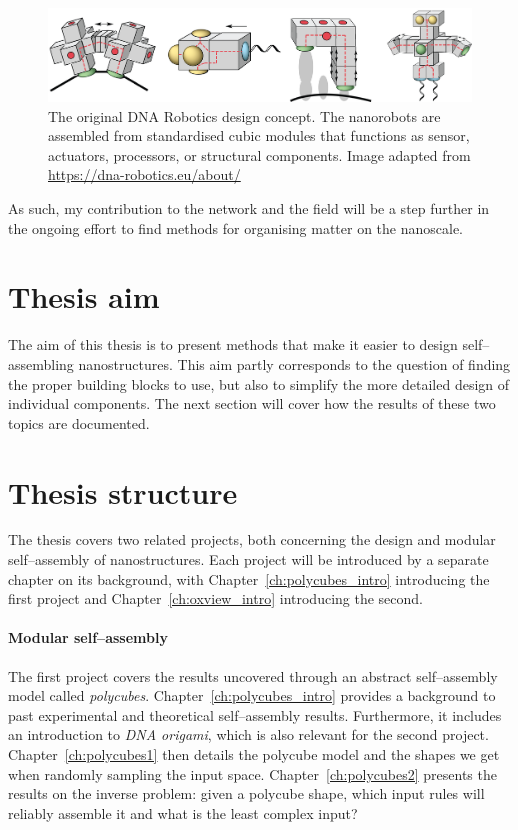 \begin{figure}
    \centering\includegraphics[width=\textwidth]{figures/dnaRoboticsHeader.png} 
    \caption{The original DNA Robotics design concept. The nanorobots are assembled from standardised cubic modules that functions as sensor, actuators, processors, or structural components. Image adapted from \url{https://dna-robotics.eu/about/}}
    \label{fig:dnaRoboticsHeader}
\end{figure}

As such, my contribution to the network and the field will be a step further in the ongoing effort to find methods for organising matter on the nanoscale.

\section{Thesis aim}
The aim of this thesis is to present methods that make it easier to design self--assembling nanostructures. This aim partly corresponds to the question of finding the proper building blocks to use, but also to simplify the more detailed design of individual components. The next section will cover how the results of these two topics are documented.

\section{Thesis structure}
The thesis covers two related projects, both concerning the design and modular self--assembly of nanostructures. Each project will be introduced by a separate chapter on its background, with Chapter~\ref{ch:polycubes_intro} introducing the first project and Chapter~\ref{ch:oxview_intro} introducing the second.

\paragraph{Modular self--assembly}
The first project covers the results uncovered through an abstract self--assembly model called \emph{polycubes}. Chapter~\ref{ch:polycubes_intro} provides a background to past experimental and theoretical self--assembly results. Furthermore, it includes an introduction to \emph{DNA origami}, which is also relevant for the second project. Chapter~\ref{ch:polycubes1} then details the polycube model and the shapes we get when randomly sampling the input space. Chapter~\ref{ch:polycubes2} presents the results on the inverse problem: given a polycube shape, which input rules will reliably assemble it and what is the least complex input?

